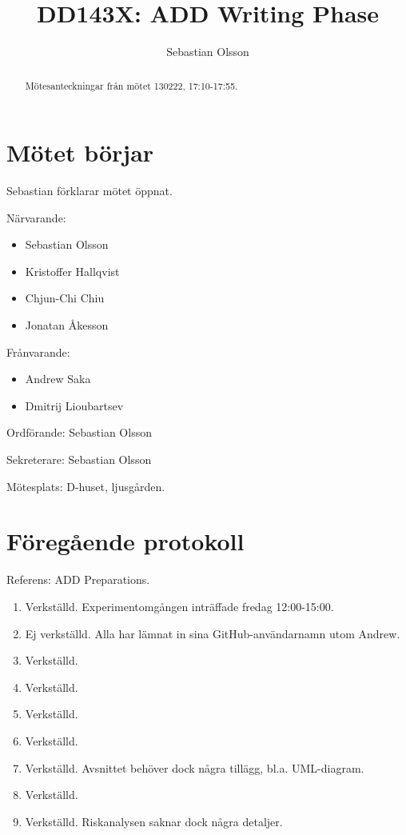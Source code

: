 \documentclass[a4paper,12pt]{article}
\author{Sebastian Olsson}
\title{DD143X: ADD Writing Phase}
\begin{document}
\maketitle
\begin{abstract}
    Mötesanteckningar från mötet 130222, 17:10-17:55.
\end{abstract}

\section{Mötet börjar}
Sebastian förklarar mötet öppnat.

Närvarande:
\begin{itemize}
\item Sebastian Olsson
\item Kristoffer Hallqvist
\item Chjun-Chi Chiu
\item Jonatan Åkesson
\end{itemize}
Frånvarande:
\begin{itemize}
\item Andrew Saka
\item Dmitrij Lioubartsev
\end{itemize}

Ordförande: Sebastian Olsson

Sekreterare: Sebastian Olsson

Mötesplats: D-huset, ljusgården.

\section{Föregående protokoll}
Referens: ADD Preparations.

\begin{enumerate}
\item Verkställd. Experimentomgången inträffade fredag 12:00-15:00.
\item Ej verkställd. Alla har lämnat in sina GitHub-användarnamn utom Andrew.
\item Verkställd.
\item Verkställd.
\item Verkställd.
\item Verkställd.
\item Verkställd. Avsnittet behöver dock några tillägg, bl.a. UML-diagram.
\item Verkställd.
\item Verkställd. Riskanalysen saknar dock några detaljer.
\end{enumerate}
\end{document}
